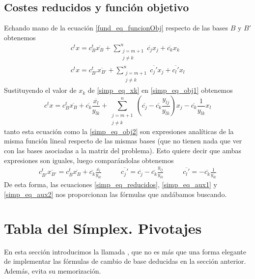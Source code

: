 \subsection{Costes reducidos y función objetivo}
Echando mano de la ecuación \eqref{fund_eq_funcionObj} respecto de las bases $B$ y $B'$ obtenemos
\begin{gather}
	c^tx=c_B^t\overline{x_B}+\sum_{\substack{j=m+1\\j\not=k}}^{n}\overline{c_j}x_j+\overline{c_k}x_k\label{simp_eq_obj1}\\
	c^tx=c_{B'}^t\overline{x_{B'}}+\sum_{\substack{j=m+1\\j\not=k}}^{n}\overline{c_j'}x_j+\overline{c_l'}x_l\label{simp_eq_obj2}
\end{gather}
Sustituyendo el valor de $x_k$ de \eqref{simp_eq_xk} en \eqref{simp_eq_obj1} obtenemos
\begin{equation*}
	c^tx=c_B^t\overline{x_B}+\overline{c_k}\frac{\overline{x_l}}{y_{lk}}+\sum_{\substack{j=m+1\\j\not=k}}^{n}\left(\overline{c_j}-\overline{c_k}\frac{y_{lj}}{y_{lk}}\right)x_j-\overline{c_k}\frac{1}{y_{lk}}x_l
\end{equation*}
tanto esta ecuación como la \eqref{simp_eq_obj2} son expresiones analíticas de la misma función lineal respecto de las mismas bases (que no tienen nada que ver con las bases asociadas a la matriz del problema). Esto quiere decir que ambas expresiones son iguales, luego comparándolas obtenemos
\begin{equation}
\label{simp_eq_reducidos}
	\begin{array}{ccc}
	\displaystyle{c_{B'}^t\overline{x_{B'}}=c_B^t\overline{x_B}+\overline{c_k}\frac{\overline{x_l}}{y_{lk}}}\qquad&\displaystyle{\overline{c_j'}=\overline{c_j}-\overline{c_k}\frac{y_{lj}}{y_{lk}}}\qquad&
	\displaystyle{\overline{c_l'}=-\overline{c_k}\frac{1}{y_{lk}}}\end{array}
\end{equation}
De esta forma, las ecuaciones \eqref{simp_eq_reducidos}, \eqref{simp_eq_aux1} y \eqref{simp_eq_aux2} nos proporcionan las fórmulas que andábamos buscando.
\section{Tabla del Símplex. Pivotajes}
En esta sección introducimos la llamada , que no es más que una forma elegante de implementar las fórmulas de cambio de base deducidas en la sección anterior. Además, evita su memorización.


